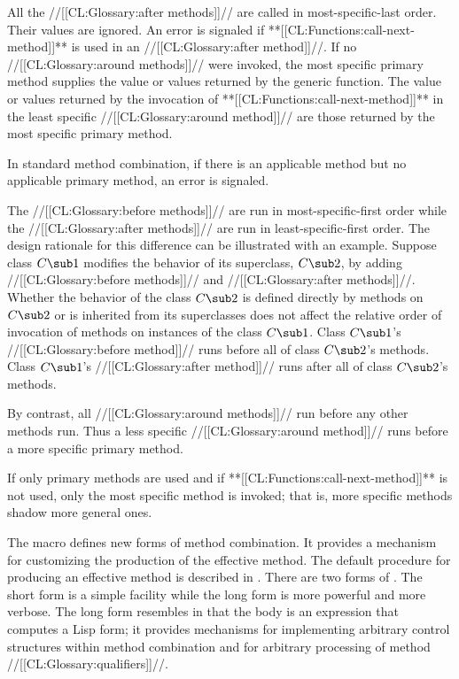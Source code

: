 \itemitem{--} All the //[[CL:Glossary:after methods]]// are called in
most-specific-last order.  Their values are ignored.
An error is signaled if **[[CL:Functions:call-next-method]]** is used in an
//[[CL:Glossary:after method]]//.
\endlist
\itemitem{\bull} If no //[[CL:Glossary:around methods]]// were invoked, the most
specific primary method supplies the value or values returned by the
generic function.  The value or values returned by the invocation of
**[[CL:Functions:call-next-method]]** in the least specific //[[CL:Glossary:around method]]// are
those returned by the most specific primary method.

\endlist

In standard method combination, if there is an applicable method
but no applicable primary method, an error is signaled.
     
The //[[CL:Glossary:before methods]]// are run in most-specific-first order while
the //[[CL:Glossary:after methods]]// are run in least-specific-first order.  The
design rationale for this difference can be illustrated with an
example.  Suppose class $C\sub 1$ modifies the behavior of its
superclass, $C\sub 2$, by adding //[[CL:Glossary:before methods]]// and //[[CL:Glossary:after methods]]//.
Whether the behavior of the class $C\sub 2$ is defined
directly by methods on $C\sub 2$ or is inherited from its superclasses
does not affect the relative order of invocation of methods on
instances of the class $C\sub 1$.  Class $C\sub 1$'s 
//[[CL:Glossary:before method]]// runs before all of class $C\sub 2$'s methods.  
Class $C\sub 1$'s //[[CL:Glossary:after method]]// runs after all of class $C\sub 2$'s methods.

By contrast, all //[[CL:Glossary:around methods]]// run before any other methods
run.  Thus a less specific //[[CL:Glossary:around method]]// runs before a more
specific primary method.

If only primary methods are used and if **[[CL:Functions:call-next-method]]** is not
used, only the most specific method is invoked; that is, more specific
methods shadow more general ones. 

\endsubsubsection%

           
The macro  defines new forms of method
combination.  It provides a mechanism for customizing the production
of the effective method. The default procedure for producing an
effective method is described in \secref\DeterminingtheEffectiveMethod.
There are two forms of
.  The short form is a simple facility while
the long form is more powerful and more verbose.  The long form
resembles  in that the body is an expression that
computes a Lisp form; it provides mechanisms for implementing
arbitrary control structures within method combination and for
arbitrary processing of method //[[CL:Glossary:qualifiers]]//.  

